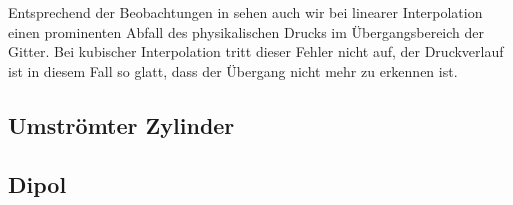 Entsprechend der Beobachtungen in \cite[Kap.~3.7]{lagrava12} sehen auch wir bei linearer Interpolation einen prominenten Abfall des physikalischen Drucks im Übergangsbereich der Gitter. Bei kubischer Interpolation tritt dieser Fehler nicht auf, der Druckverlauf ist in diesem Fall so glatt, dass der Übergang nicht mehr zu erkennen ist.

\subsection{Umströmter Zylinder}

\subsection{Dipol}
